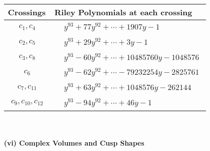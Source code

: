 \documentclass[1p]{elsarticle_modified}
\theoremstyle{definition}
\begin{document}
\begin{tabular}{m{50pt}|m{274pt}}
Crossings & \hspace{64pt}Riley Polynomials at each crossing \\
\hline $$\begin{aligned}c_{1},c_{4}\end{aligned}$$&$\begin{aligned}
&y^{93}+77 y^{92}+\cdots+1907 y-1
\end{aligned}$\\
\hline $$\begin{aligned}c_{2},c_{5}\end{aligned}$$&$\begin{aligned}
&y^{93}+29 y^{92}+\cdots+3 y-1
\end{aligned}$\\
\hline $$\begin{aligned}c_{3},c_{8}\end{aligned}$$&$\begin{aligned}
&y^{93}-60 y^{92}+\cdots+10485760 y-1048576
\end{aligned}$\\
\hline $$\begin{aligned}c_{6}\end{aligned}$$&$\begin{aligned}
&y^{93}-62 y^{92}+\cdots-79232254 y-2825761
\end{aligned}$\\
\hline $$\begin{aligned}c_{7},c_{11}\end{aligned}$$&$\begin{aligned}
&y^{93}+63 y^{92}+\cdots+1048576 y-262144
\end{aligned}$\\
\hline $$\begin{aligned}c_{9},c_{10},c_{12}\end{aligned}$$&$\begin{aligned}
&y^{93}-94 y^{92}+\cdots+46 y-1
\end{aligned}$\\
\hline
\end{tabular}\\~\\
\newpage\flushleft \textbf{(vi) Complex Volumes and Cusp Shapes}
\end{document}
